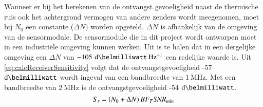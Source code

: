 Wanneer er  bij het berekenen van de ontvangst gevoeligheid naast de thermische ruis ook het achtergrond vermogen van andere zenders wordt meegenomen, moet bij $N_0$ een constante ($\Delta N)$ worden opgeteld. $\Delta N$ is afhankelijk van de omgeving van de sensormodule. De sensormodule die in dit project wordt ontworpen moet in een industriële omgeving kunnen werken. Uit \cite{kumar2020spectrum} is te halen dat in een dergelijke omgeving een $\Delta N$ van $-105\,\,\si{\deci\belmilliwatt\,\hertz^{-1}}$ een redelijke waarde is. Uit \autoref{eq:calcReceiverSensitivity} volgt dat de ontvangstgevoeligheid -57 $\si{\deci\belmilliwatt}$ wordt ingeval van een bandbreedte van $\SI{1}{\mega\hertz}$. Met een bandbreedte van $\SI{2}{\mega\hertz}$ is de ontvangstgevoeligheid -54 $\si{\deci\belmilliwatt}$.
\begin{equation}\label{eq:calcReceiverSensitivity}
    S_r=\left(N_0+\Delta N\right)BF_T \SNR_{min}
    \tagaddtext{[\si{\deci\belmilliwatt}]}
\end{equation}

